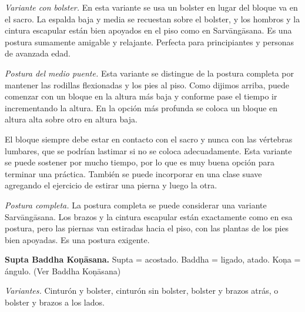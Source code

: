 \emph{Variante con bolster.} En esta variante
se usa un bolster en lugar del bloque va en
el sacro. La espalda baja y media se
recuestan sobre el bolster, y los hombros y
la cintura escapular están bien apoyados en
el piso como en Sarvāngāsana. Es una postura
sumamente amigable y relajante. Perfecta para
principiantes y personas de avanzada edad.

\emph{Postura del medio puente.} Esta
variante se distingue de la postura completa
por mantener las rodillas flexionadas y los
pies al piso. Como dijimos arriba, puede
comenzar con un bloque en la altura más baja
y conforme pase el tiempo ir incrementando la
altura. En la opción más profunda se coloca
un bloque en altura alta sobre otro en altura
baja.

El bloque siempre debe estar en contacto con
el sacro y nunca con las vértebras lumbares,
que se podrían lastimar si no se coloca
adecuadamente. Esta variante se puede
sostener por mucho tiempo, por lo que es muy
buena opción para terminar una práctica.
También se puede incorporar en una clase
suave agregando el ejercicio de estirar una
pierna y luego la otra.

\emph{Postura completa.} La postura completa
se puede considerar una variante
Sarvāngāsana. Los brazos y la cintura
escapular están exactamente como en esa
postura, pero las piernas van estiradas hacia
el piso, con las plantas de los pies bien
apoyadas. Es una postura exigente.

\medskip\noindent\textbf{Supta Baddha
Koṇāsana.}
Supta = acostado. Baddha = ligado, atado.
Koṇa = ángulo. (Ver Baddha Koṇāsana)

\emph{Variantes.} Cinturón y bolster,
cinturón sin bolster, bolster y brazos atrás,
o bolster y brazos a los lados.


